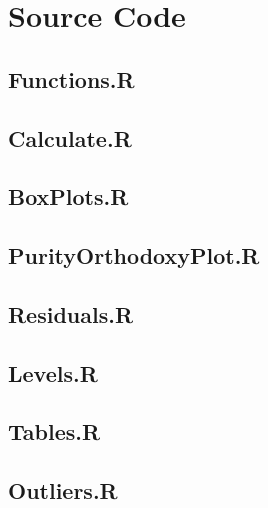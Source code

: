 \chapter{Source Code}

\section{Functions.R}\label{src:functions}


\section{Calculate.R}\label{src:calculate}


\section{BoxPlots.R}\label{src:boxPlots}


\section{PurityOrthodoxyPlot.R}\label{src:purityOrthodoxyPlot}


\section{Residuals.R}\label{src:residuals}


\section{Levels.R}\label{src:levels}


\section{Tables.R}\label{src:tables}


\section{Outliers.R}\label{src:outliers}

